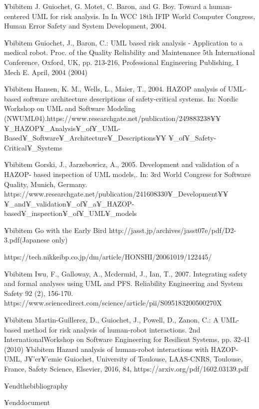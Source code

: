 ¥bibitem  J. Guiochet, G. Motet, C. Baron, and G. Boy. Toward a human-centered UML for risk analysis. In In WCC 18th IFIP World Computer Congress, Human Error Safety and System Development, 2004.


¥bibitem Guiochet, J., Baron, C.: UML based risk analysis - Application to a medical robot. Proc. of the Quality Reliability and Maintenance 5th International Conference, Oxford, UK, pp. 213-216, Professional Engineering Publishing, I Mech E. April, 2004 (2004)

¥bibitem  Hansen, K. M., Wells, L., Maier, T., 2004. HAZOP analysis of UML-based software architecture descriptions of safety-critical systems. In: Nordic Workshop on UML and Software Modeling (NWUML04).https://www.researchgate.net/publication/249883238¥¥
¥_HAZOP¥_Analysis¥_of¥_UML-Based¥_Software¥_Architecture¥_Descriptions¥¥
¥_of¥_Safety-Critical¥_Systems


¥bibitem Gorski, J., Jarzebowicz, A., 2005. Development and validation of a HAZOP- based inspection of UML models,. In: 3rd World Congress for Software Quality, Munich, Germany. https://www.researchgate.net/publication/241608330¥_Development¥¥
¥_and¥_validation¥_of¥_a¥_HAZOP-based¥_inspection¥_of¥_UML¥_models



¥bibitem 
Go with the Early Bird
http://jasst.jp/archives/jasst07e/pdf/D2-3.pdf(Japanese only)

https://tech.nikkeibp.co.jp/dm/article/HONSHI/20061019/122445/

¥bibitem  Iwu, F., Galloway, A., Mcdermid, J., Ian, T., 2007. Integrating safety and formal analyses using UML and PFS. Reliability Engineering and System Safety 92 (2), 156-170. https://www.sciencedirect.com/science/article/pii/S095183200500270X


¥bibitem Martin-Guillerez, D., Guiochet, J., Powell, D., Zanon, C.: A UML-based method for risk analysis of human-robot interactions. 2nd InternationalWorkshop on Software Engineering for Resilient Systems, pp. 32-41 (2010)
¥bibitem Hazard analysis of human-robot interactions with HAZOP-UML, J¥'{e}r¥'{e}mie Guiochet, University of Toulouse, LAAS-CNRS, Toulouse, France, Safety Science, Elsevier, 2016, 84, https://arxiv.org/pdf/1602.03139.pdf

¥end{thebibliography}







¥end{document}
